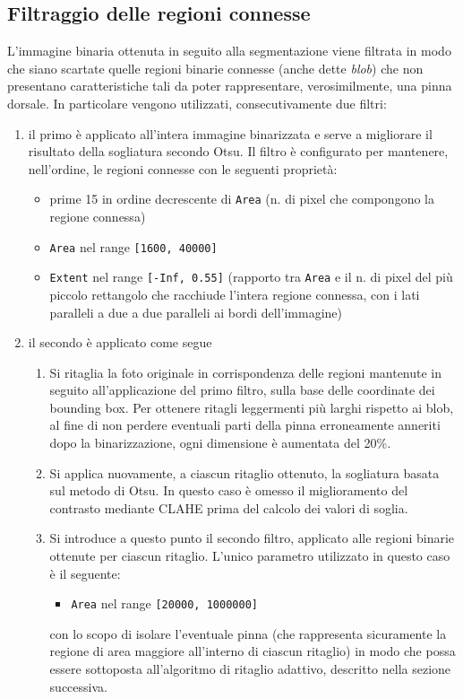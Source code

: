 \subsection*{Filtraggio delle regioni connesse}
L’immagine binaria ottenuta in seguito alla segmentazione viene filtrata in modo che siano scartate quelle regioni binarie connesse (anche dette \textit{blob}) che non presentano caratteristiche tali da poter rappresentare, verosimilmente, una pinna dorsale.
In particolare vengono utilizzati, consecutivamente due filtri:
\begin{enumerate}

\item il primo è applicato all'intera immagine binarizzata e serve a migliorare il risultato della sogliatura secondo Otsu.
Il filtro è configurato per mantenere, nell'ordine, le regioni connesse con le seguenti proprietà:
\begin{itemize}
\item prime 15 in ordine decrescente di \verb|Area| (n. di pixel che compongono la regione connessa)
\item \verb|Area| nel range \verb|[1600, 40000]|
\item \verb|Extent| nel range \verb|[-Inf, 0.55]| (rapporto tra \verb|Area| e il n. di pixel del più piccolo rettangolo che racchiude l'intera regione connessa, con i lati paralleli a due a due paralleli ai bordi dell'immagine)
\end{itemize}

\item il secondo è applicato come segue
\begin{enumerate}
\item Si ritaglia la foto originale in corrispondenza delle regioni mantenute in seguito all’applicazione del primo filtro, sulla base delle coordinate dei bounding box. Per ottenere ritagli leggermenti più larghi rispetto ai blob, al fine di non perdere eventuali parti della pinna erroneamente anneriti dopo la binarizzazione, ogni dimensione è aumentata del 20\%.
\item Si applica nuovamente, a ciascun ritaglio ottenuto, la sogliatura basata sul metodo di Otsu. In questo caso è omesso il miglioramento del contrasto mediante CLAHE prima del calcolo dei valori di soglia.
\item Si introduce a questo punto il secondo filtro, applicato alle regioni binarie ottenute per ciascun ritaglio. L’unico parametro utilizzato in questo caso è il seguente:
\begin{itemize}
\item \verb|Area| nel range \verb|[20000, 1000000]|
\end{itemize}
con lo scopo di isolare l’eventuale pinna (che rappresenta sicuramente la regione di area maggiore all’interno di ciascun ritaglio) in modo che possa essere sottoposta all’algoritmo di ritaglio adattivo, descritto nella sezione successiva.
\end{enumerate}
\end{enumerate}

